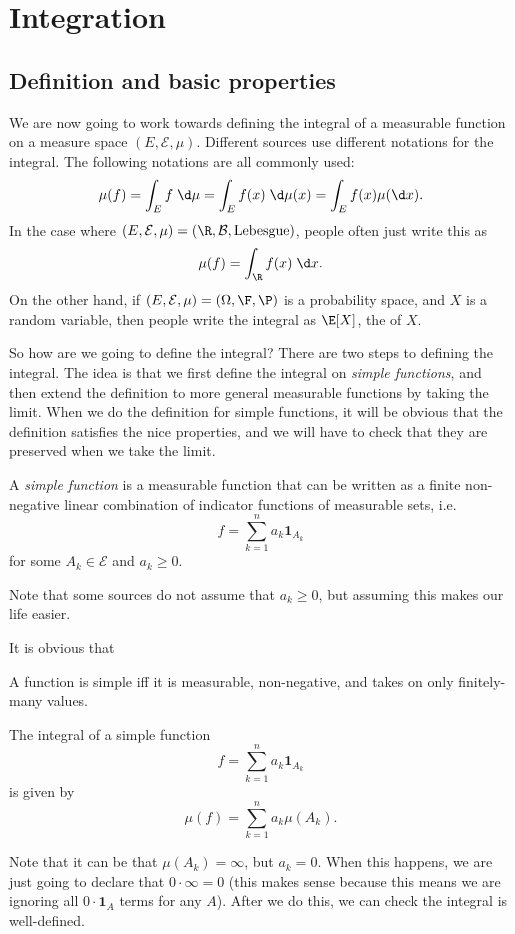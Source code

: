 \documentclass[a4paper]{article}
\begin{document}
\section{Integration}
\subsection{Definition and basic properties}
We are now going to work towards defining the integral of a measurable function on a measure space $(E, \mathcal{E}, \mu)$. Different sources use different notations for the integral. The following notations are all commonly used:
\[
  \mu(f) = \int_E f \;\d \mu = \int_E f(x) \;\d \mu(x) = \int_E f(x) \mu(\d x).
\]
In the case where $(E, \mathcal{E}, \mu) = (\R, \mathcal{B}, \mathrm{Lebesgue})$, people often just write this as
\[
  \mu(f) = \int_\R f(x)\;\d x.
\]
On the other hand, if $(E, \mathcal{E}, \mu) = (\Omega, \F, \P)$ is a probability space, and $X$ is a random variable, then people write the integral as $\E[X]$, the  of $X$.\index{$\E[X]$}

So how are we going to define the integral? There are two steps to defining the integral. The idea is that we first define the integral on \emph{simple functions}, and then extend the definition to more general measurable functions by taking the limit. When we do the definition for simple functions, it will be obvious that the definition satisfies the nice properties, and we will have to check that they are preserved when we take the limit.

\begin{defi}
  A \emph{simple function} is a measurable function that can be written as a finite non-negative linear combination of indicator functions of measurable sets, i.e.
  \[
    f = \sum_{k = 1}^n a_k \mathbf{1}_{A_k}
  \]
  for some $A_k \in \mathcal{E}$ and $a_k \geq 0$.
\end{defi}
Note that some sources do not assume that $a_k \geq 0$, but assuming this makes our life easier.

It is obvious that
\begin{prop}
  A function is simple iff it is measurable, non-negative, and takes on only finitely-many values.
\end{prop}

\begin{defi}
  The integral of a simple function
  \[
    f = \sum_{k = 1}^n a_k \mathbf{1}_{A_k}
  \]
  is given by
  \[
    \mu(f) = \sum_{k = 1}^n a_k \mu(A_k).
  \]
\end{defi}
Note that it can be that $\mu(A_k) = \infty$, but $a_k = 0$. When this happens, we are just going to declare that $0 \cdot \infty = 0$ (this makes sense because this means we are ignoring all $0 \cdot\mathbf{1}_A$ terms for any $A$). After we do this, we can check the integral is well-defined.
\end{document}
